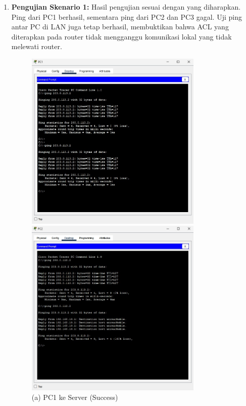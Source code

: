 \begin{enumerate}
    \item \textbf{Pengujian Skenario 1:} Hasil pengujian sesuai dengan yang diharapkan. Ping dari PC1 berhasil, sementara ping dari PC2 dan PC3 gagal. Uji ping antar PC di LAN juga tetap berhasil, membuktikan bahwa ACL yang diterapkan pada router tidak mengganggu komunikasi lokal yang tidak melewati router.
    \begin{figure}[H]
        \centering
        \begin{minipage}{0.48\textwidth}
            \centering
            \includegraphics[width=0.8\textwidth]{img4/PC1Ping.jpeg}
            \caption*{(a) PC1 ke Server (Success)}
        \end{minipage}\hfill
        \begin{minipage}{0.48\textwidth}
            \centering
            \includegraphics[width=0.8\textwidth]{img4/PC2Ping.jpeg}

\end{minipage}
\end{figure}
\end{enumerate}
